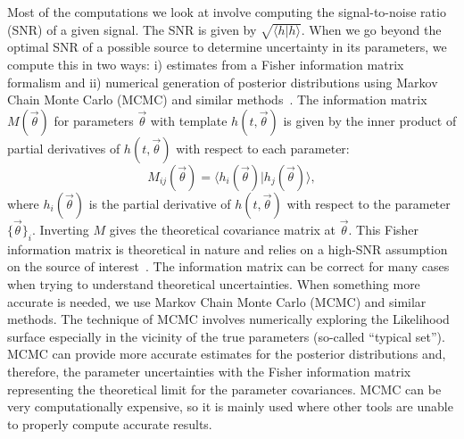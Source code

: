 Most of the computations we look at involve computing the signal-to-noise ratio (SNR) of a given signal. The SNR is given by $\sqrt{\langle h |h\rangle}$. When we go beyond the optimal SNR of a possible source to determine uncertainty in its parameters, we compute this in two ways: i) estimates from a Fisher information matrix formalism and ii) numerical generation of posterior distributions using Markov Chain Monte Carlo (MCMC) and similar methods~\cite{Karnesis:2023ras,Katz:2024oqg}. The information matrix $M(\vec{\theta})$ for parameters $\vec{\theta}$ with template $h(t, \vec{\theta})$ is given by the inner product of partial derivatives of $h(t, \vec{\theta})$ with respect to each parameter:
\begin{equation}
    M_{ij}(\vec{\theta}) = \langle h_i(\vec{\theta})|h_j(\vec{\theta})\rangle,
\end{equation}
where $h_i(\vec{\theta})$ is the partial derivative of $h(t, \vec{\theta})$ with respect to the parameter $\{\vec{\theta}\}_i$. Inverting $M$ gives the theoretical covariance matrix at $\vec{\theta}$. This Fisher information matrix is theoretical in nature and relies on a high-SNR assumption on the source of interest~\cite{Vallisneri:2007ev}. The information matrix can be correct for many cases when trying to understand theoretical uncertainties. When something more accurate is needed, we use Markov Chain Monte Carlo (MCMC) and similar methods. The technique of MCMC involves numerically exploring the Likelihood surface especially in the vicinity of the true parameters (so-called ``typical set''). MCMC can provide more accurate estimates for the posterior distributions and, therefore, the parameter uncertainties with the Fisher information matrix representing the theoretical limit for the parameter covariances. MCMC can be very computationally expensive, so it is mainly used where other tools are unable to properly compute accurate results.

